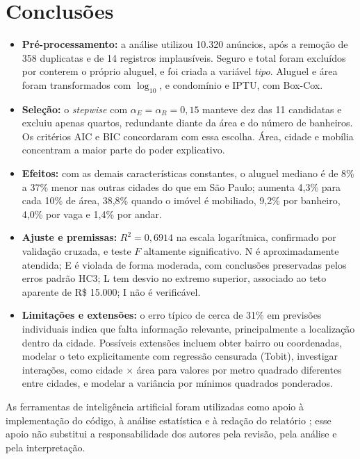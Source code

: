 \documentclass[12pt,a4paper]{article}
\newcommand{\Rtwo}{\ensuremath{R^2}}
\begin{document}
\section{Conclusões}

\begin{itemize}
  \item \textbf{Pré-processamento:} a análise utilizou 10.320 anúncios, após a remoção de 358 duplicatas e de 14 registros implausíveis. Seguro e total foram excluídos por conterem o próprio aluguel, e foi criada a variável \textit{tipo}. Aluguel e área foram transformados com $\log_{10}$, e condomínio e IPTU, com Box-Cox.
  \item \textbf{Seleção:} o \textit{stepwise} com $\alpha_E=\alpha_R=0{,}15$ manteve dez das 11 candidatas e excluiu apenas quartos, redundante diante da área e do número de banheiros. Os critérios AIC e BIC concordaram com essa escolha. Área, cidade e mobília concentram a maior parte do poder explicativo.
  \item \textbf{Efeitos:} com as demais características constantes, o aluguel mediano é de 8\% a 37\% menor nas outras cidades do que em São Paulo; aumenta 4,3\% para cada 10\% de área, 38,8\% quando o imóvel é mobiliado, 9,2\% por banheiro, 4,0\% por vaga e 1,4\% por andar.
  \item \textbf{Ajuste e premissas:} \Rtwo$=0{,}6914$ na escala logarítmica, confirmado por validação cruzada, e teste $F$ altamente significativo. N é aproximadamente atendida; E é violada de forma moderada, com conclusões preservadas pelos erros padrão HC3; L tem desvio no extremo superior, associado ao teto aparente de R\$ 15.000; I não é verificável.
  \item \textbf{Limitações e extensões:} o erro típico de cerca de 31\% em previsões individuais indica que falta informação relevante, principalmente a localização dentro da cidade. Possíveis extensões incluem obter bairro ou coordenadas, modelar o teto explicitamente com regressão censurada (Tobit), investigar interações, como cidade $\times$ área para valores por metro quadrado diferentes entre cidades, e modelar a variância por mínimos quadrados ponderados.
\end{itemize}

As ferramentas de inteligência artificial foram utilizadas como apoio à implementação do código, à análise estatística e à redação do relatório \cite{claude}; esse apoio não substitui a responsabilidade dos autores pela revisão, pela análise e pela interpretação.
\end{document}

